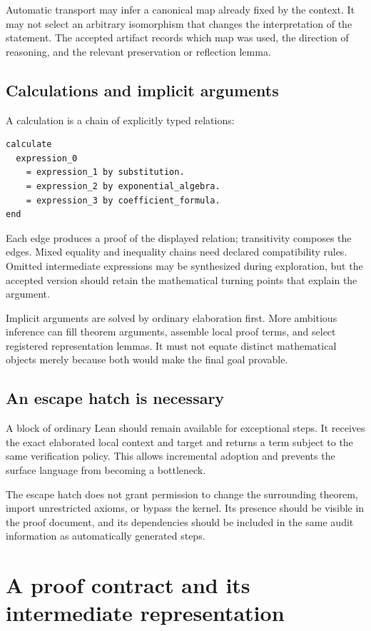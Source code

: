 \documentclass[11pt,a4paper]{article}
\theoremstyle{remark}
\begin{document}
Automatic transport may infer a canonical map already fixed by the context. It may not select an arbitrary isomorphism that changes the interpretation of the statement. The accepted artifact records which map was used, the direction of reasoning, and the relevant preservation or reflection lemma.

\subsection{Calculations and implicit arguments}

A calculation is a chain of explicitly typed relations:
\begin{lstlisting}
calculate
  expression_0
    = expression_1 by substitution.
    = expression_2 by exponential_algebra.
    = expression_3 by coefficient_formula.
end
\end{lstlisting}
Each edge produces a proof of the displayed relation; transitivity composes the edges. Mixed equality and inequality chains need declared compatibility rules. Omitted intermediate expressions may be synthesized during exploration, but the accepted version should retain the mathematical turning points that explain the argument.

Implicit arguments are solved by ordinary elaboration first. More ambitious inference can fill theorem arguments, assemble local proof terms, and select registered representation lemmas. It must not equate distinct mathematical objects merely because both would make the final goal provable.

\subsection{An escape hatch is necessary}

A block of ordinary Lean should remain available for exceptional steps. It receives the exact elaborated local context and target and returns a term subject to the same verification policy. This allows incremental adoption and prevents the surface language from becoming a bottleneck.

The escape hatch does not grant permission to change the surrounding theorem, import unrestricted axioms, or bypass the kernel. Its presence should be visible in the proof document, and its dependencies should be included in the same audit information as automatically generated steps.

\section{A proof contract and its intermediate representation}
\label{sec:contracts}
\end{document}
